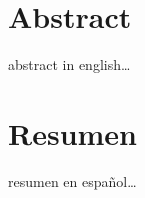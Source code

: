 \begingroup
\let\clearpage\relax
\let\cleardoublepage\relax
\let\cleardoublepage\relax

\chapter*{Abstract}
abstract in english\dots


\vfill

\chapter*{Resumen}
resumen en español\dots


\endgroup			

\vfill
